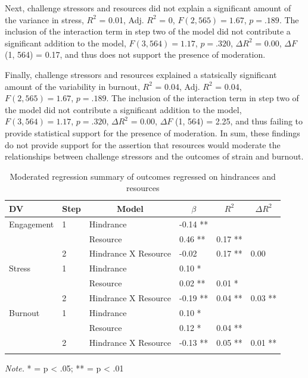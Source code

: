 \documentclass[
  man,mask]{apa7}
\begin{document}
Next, challenge stressors and resources did not explain a significant amount of the variance in stress, \(R^2\) = 0.01, Adj. \(R^2\) = 0, \(F(2, 565) = 1.67\), \(p = .189\). The inclusion of the interaction term in step two of the model did not contribute a significant addition to the model, \(F(3, 564) = 1.17\), \(p = .320\), \(\Delta R^2\) = 0.00, \(\Delta F\) (1, 564) = 0.17, and thus does not support the presence of moderation.

Finally, challenge stressors and resources explained a statsically significant amount of the variability in burnout, \(R^2\) = 0.04, Adj. \(R^2\) = 0.04, \(F(2, 565) = 1.67\), \(p = .189\). The inclusion of the interaction term in step two of the model did not contribute a significant addition to the model, \(F(3, 564) = 1.17\), \(p = .320\), \(\Delta R^2\) = 0.00, \(\Delta F\) (1, 564) = 2.25, and thus failing to provide statistical support for the presence of moderation. In sum, these findings do not provide support for the assertion that resources would moderate the relationships between challenge stressors and the outcomes of strain and burnout.

\begin{table}[tbp]

\begin{center}
\begin{threeparttable}

\caption{\label{tab:hind-resource-table}Moderated regression summary of outcomes regressed on hindrances and resources}

\begin{tabular}{llllll}
\toprule
DV & \multicolumn{1}{c}{Step} & \multicolumn{1}{c}{Model} & \multicolumn{1}{c}{$\beta$} & \multicolumn{1}{c}{$R^2$} & \multicolumn{1}{c}{$\Delta R^2$}\\
\midrule
Engagement & 1 & Hindrance & -0.14 ** &  & \\
 &  & Resource & 0.46 ** & 0.17 ** & \\
 & 2 & Hindrance X Resource & -0.02 & 0.17 ** & 0.00\\
Stress & 1 & Hindrance & 0.10 * &  & \\
 &  & Resource & 0.02 ** & 0.01 * & \\
 & 2 & Hindrance X Resource & -0.19 ** & 0.04 ** & 0.03 **\\
Burnout & 1 & Hindrance & 0.10 * &  & \\
 &  & Resource & 0.12 * & 0.04 ** & \\
 & 2 & Hindrance X Resource & -0.13 ** & 0.05 ** & 0.01 **\\
\bottomrule
\addlinespace
\end{tabular}

\begin{tablenotes}[para]
\normalsize{\textit{Note.} * = p < .05; ** = p < .01}
\end{tablenotes}

\end{threeparttable}
\end{center}

\end{table}
\end{document}

